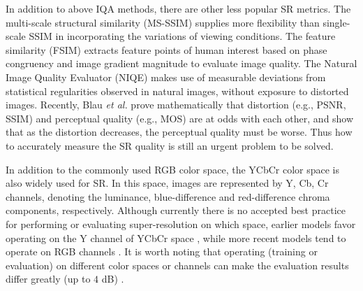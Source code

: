 In addition to above IQA methods, there are other less popular SR metrics.
The multi-scale structural similarity (MS-SSIM)  supplies more flexibility than single-scale SSIM in incorporating the variations of viewing conditions.
The feature similarity (FSIM)  extracts feature points of human interest based on phase congruency and image gradient magnitude to evaluate image quality.
The Natural Image Quality Evaluator (NIQE)  makes use of measurable deviations from statistical regularities observed in natural images, without exposure to distorted images.
Recently, Blau \textit{et al.}  prove mathematically that distortion (e.g., PSNR, SSIM) and perceptual quality (e.g., MOS) are at odds with each other, and show that as the distortion decreases, the perceptual quality must be worse.
Thus how to accurately measure the SR quality is still an urgent problem to be solved.

In addition to the commonly used RGB color space, the YCbCr color space is also widely used for SR.  
In this space, images are represented by Y, Cb, Cr channels, denoting the luminance, blue-difference and red-difference chroma components, respectively.
Although currently there is no accepted best practice for performing or evaluating super-resolution on which space, earlier models favor operating on the Y channel of YCbCr space , while more recent models tend to operate on RGB channels .
It is worth noting that operating (training or evaluation) on different color spaces or channels can make the evaluation results differ greatly (up to $4$ dB) .

